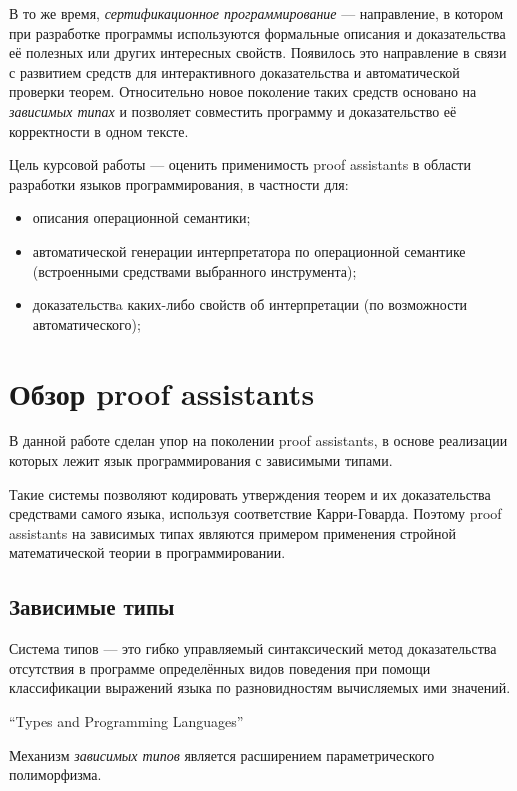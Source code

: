 \documentclass[aps,12pt,final,oneside,onecolumn,musixtex,superscriptaddress,centertags]{article}
\begin{document}
     В то же время, \emph{сертификационное программирование} --- направление, в котором при разработке программы используются формальные описания и доказательства её полезных или других интересных свойств. Появилось это направление в связи с развитием средств для интерактивного доказательства и автоматической проверки теорем. Относительно новое поколение таких средств основано на \emph{зависимых типах} и позволяет совместить программу и доказательство её корректности в одном тексте.

     Цель курсовой работы --- оценить применимость proof assistants в области разработки языков программирования, в частности для:
     \begin{itemize}
        \item описания операционной семантики;
        \item автоматической генерации интерпретатора по операционной семантике (встроенными средствами выбранного инструмента);
        \item доказательствa каких-либо свойств об интерпретации (по возможности автоматического);
     \end{itemize}

  \newpage
  \section{Обзор proof assistants}

     В данной работе сделан упор на поколении proof assistants, в основе реализации которых лежит язык программирования с зависимыми типами.

     Такие системы позволяют кодировать утверждения теорем и их доказательства средствами самого языка, используя соответствие Карри-Говарда. Поэтому proof assistants на зависимых типах являются примером применения стройной математической теории в программировании. 

  \subsection{Зависимые типы}

     \setlength{\epigraphwidth}{10cm}
     \epigraph{Система типов --- это гибко управляемый синтаксический метод доказательства отсутствия в программе определённых видов поведения при помощи классификации выражений языка по разновидностям вычисляемых ими значений.}{``Types and Programming Languages''\cite{Pierce:2002:TPL:509043}}

     Механизм \emph{зависимых типов} является расширением параметрического полиморфизма.
\end{document}
